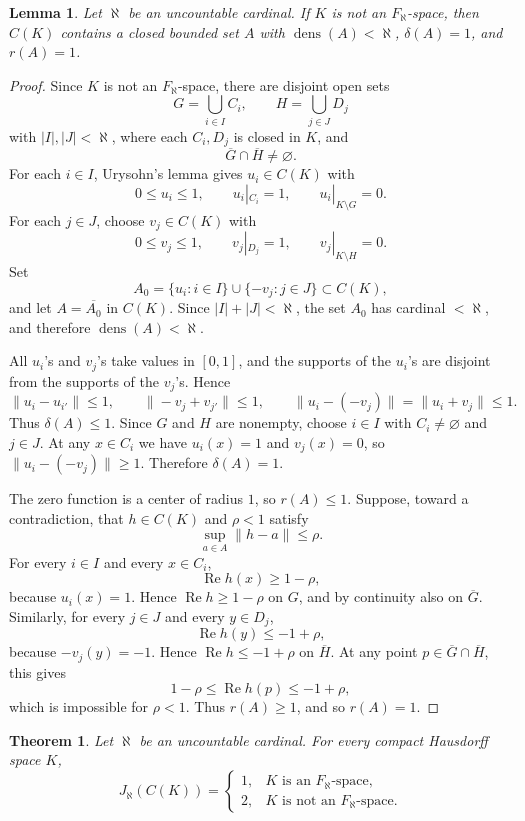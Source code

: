 \documentclass[11pt]{article}
\newtheorem{theorem}{Theorem}
\newtheorem{lemma}{Lemma}
\newcommand{\Ree}{\operatorname{Re}}
\newcommand{\dens}{\operatorname{dens}}
\begin{document}
\begin{lemma}\label{lem:non-faleph-witness}
Let \(\aleph\) be an uncountable cardinal. If \(K\) is not an
\(F_{\aleph}\)-space, then \(C(K)\) contains a closed bounded set \(A\) with
\(\dens(A)<\aleph\), \(\delta(A)=1\), and \(r(A)=1\).
\end{lemma}

\begin{proof}
Since \(K\) is not an \(F_{\aleph}\)-space, there are disjoint open sets
\[
        G=\bigcup_{i\in I} C_i,\qquad
        H=\bigcup_{j\in J} D_j
\]
with \(|I|,|J|<\aleph\), where each \(C_i,D_j\) is closed in \(K\), and
\[
        \overline G\cap\overline H\neq\varnothing .
\]
For each \(i\in I\), Urysohn's lemma gives \(u_i\in C(K)\) with
\[
        0\leq u_i\leq 1,\qquad u_i|_{C_i}=1,\qquad u_i|_{K\setminus G}=0.
\]
For each \(j\in J\), choose \(v_j\in C(K)\) with
\[
        0\leq v_j\leq 1,\qquad v_j|_{D_j}=1,\qquad v_j|_{K\setminus H}=0.
\]
Set
\[
        A_0=\{u_i:i\in I\}\cup\{-v_j:j\in J\}\subset C(K),
\]
and let \(A=\overline{A_0}\) in \(C(K)\). Since \(|I|+|J|<\aleph\), the
set \(A_0\) has cardinal \(<\aleph\), and therefore \(\dens(A)<\aleph\).

All \(u_i\)'s and \(v_j\)'s take values in \([0,1]\), and the supports of
the \(u_i\)'s are disjoint from the supports of the \(v_j\)'s. Hence
\[
 \|u_i-u_{i'}\|\leq 1,\qquad
 \|-v_j+v_{j'}\|\leq 1,\qquad
 \|u_i-(-v_j)\|=\|u_i+v_j\|\leq 1.
\]
Thus \(\delta(A)\leq 1\). Since \(G\) and \(H\) are nonempty, choose
\(i\in I\) with \(C_i\neq\varnothing\) and \(j\in J\). At any
\(x\in C_i\) we have \(u_i(x)=1\) and \(v_j(x)=0\), so
\(\|u_i-(-v_j)\|\geq 1\). Therefore \(\delta(A)=1\).

The zero function is a center of radius \(1\), so \(r(A)\leq 1\). Suppose,
toward a contradiction, that \(h\in C(K)\) and \(\rho<1\) satisfy
\[
        \sup_{a\in A}\|h-a\|\leq \rho .
\]
For every \(i\in I\) and every \(x\in C_i\),
\[
        \Ree h(x)\geq 1-\rho,
\]
because \(u_i(x)=1\). Hence \(\Ree h\geq 1-\rho\) on \(G\), and by
continuity also on \(\overline G\). Similarly, for every \(j\in J\) and
every \(y\in D_j\),
\[
        \Ree h(y)\leq -1+\rho,
\]
because \(-v_j(y)=-1\). Hence \(\Ree h\leq -1+\rho\) on
\(\overline H\). At any point
\(p\in\overline G\cap\overline H\), this gives
\[
        1-\rho\leq \Ree h(p)\leq -1+\rho,
\]
which is impossible for \(\rho<1\). Thus \(r(A)\geq 1\), and so
\(r(A)=1\).
\end{proof}

\begin{theorem}\label{thm:dichotomy}
Let \(\aleph\) be an uncountable cardinal. For every compact Hausdorff
space \(K\),
\[
        J_{\aleph}(C(K))=
        \begin{cases}
        1, & K\text{ is an }F_{\aleph}\text{-space},\\
        2, & K\text{ is not an }F_{\aleph}\text{-space}.
        \end{cases}
\]
\end{theorem}
\end{document}
